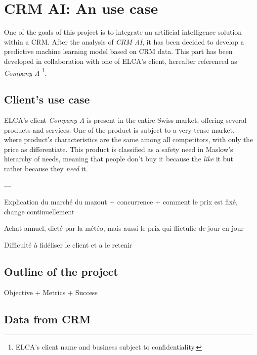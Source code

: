 \chapter{CRM AI: An use case}

One of the goals of this project is to integrate an artificial intelligence solution within a CRM. After the analysis of \textit{CRM AI}, it has been decided to develop a predictive machine learning model based on CRM data. This part has been developed in collaboration with one of ELCA's client, hereafter referenced as \textit{Company A} \footnote{ELCA's client name and business subject to confidentiality.}.


\section{Client's use case}
ELCA's client \textit{Company A} is present in the entire Swiss market, offering several products and services. One of the product is subject to a very tense market, where product's characteristics are the same among all competitors, with only the price as differentiate. This product is classified as a safety need in Maslow's hierarchy of needs\cite{wiki:Maslow's_hierarchy_of_needs}, meaning that people don't buy it because the \textit{like} it but rather because they \textit{need} it.


---

Explication du marché du mazout + concurrence + comment le prix est fixé, change continuellement

Achat annuel, dicté par la météo, mais aussi le prix qui flictufie de jour en jour

Difficulté à fidéliser le client et a le retenir


\section{Outline of the project}
Objective + Metrics + Success

\lipsum[1]

\section{Data from CRM}
\lipsum[1]


